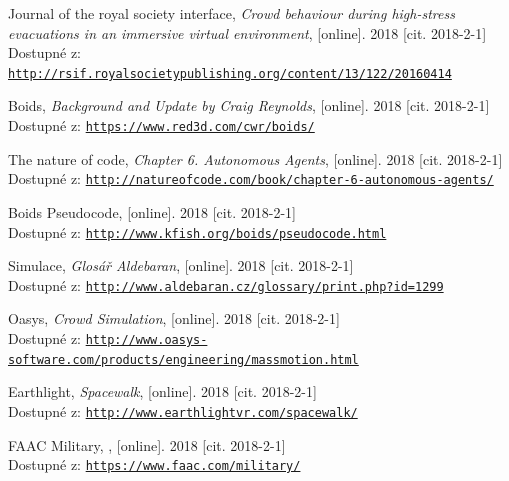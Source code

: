 \documentclass[czech,public,dept460,male,cpdeclaration]{diploma}
\begin{document}
\begin{thebibliography}{99}
	
	 Journal of the royal society interface, 
		\textit{Crowd behaviour during high-stress evacuations in an immersive virtual environment}, [online]. 2018 [cit. 2018-2-1]\\
		Dostupné z: \href{http://rsif.royalsocietypublishing.org/content/13/122/20160414}{\texttt{http://rsif.royalsocietypublishing.org/content/13/122/20160414}}
	
	 Boids, 
		\textit{Background and Update by Craig Reynolds}, [online]. 2018 [cit. 2018-2-1]\\
		Dostupné z: \href{https://www.red3d.com/cwr/boids/}{\texttt{https://www.red3d.com/cwr/boids/}}
	
	 The nature of code, 
		\textit{Chapter 6. Autonomous Agents}, [online]. 2018 [cit. 2018-2-1]\\
		Dostupné z: \href{http://natureofcode.com/book/chapter-6-autonomous-agents/}{\texttt{http://natureofcode.com/book/chapter-6-autonomous-agents/}}

	 Boids Pseudocode, 
		[online]. 2018 [cit. 2018-2-1]\\
		Dostupné z: \href{http://www.kfish.org/boids/pseudocode.html}{\texttt{http://www.kfish.org/boids/pseudocode.html}}
		
	 Simulace,
		\textit{Glosář Aldebaran}, [online]. 2018 [cit. 2018-2-1]\\
		Dostupné z: \href{http://www.aldebaran.cz/glossary/print.php?id=1299}{\texttt{http://www.aldebaran.cz/glossary/print.php?id=1299}}
		
	 Oasys,
		\textit{Crowd Simulation}, [online]. 2018 [cit. 2018-2-1]\\
		Dostupné z: \href{http://www.oasys-software.com/products/engineering/massmotion.html}{\texttt{http://www.oasys-software.com/products/engineering/massmotion.html}}
		
	 Earthlight,
		\textit{Spacewalk}, [online]. 2018 [cit. 2018-2-1]\\
		Dostupné z: \href{http://www.earthlightvr.com/spacewalk/}{\texttt{http://www.earthlightvr.com/spacewalk/}}
		
	 FAAC Military,
		, [online]. 2018 [cit. 2018-2-1]\\
		Dostupné z: \href{https://www.faac.com/military/}{\texttt{https://www.faac.com/military/}}
		

\end{thebibliography}
\end{document}
